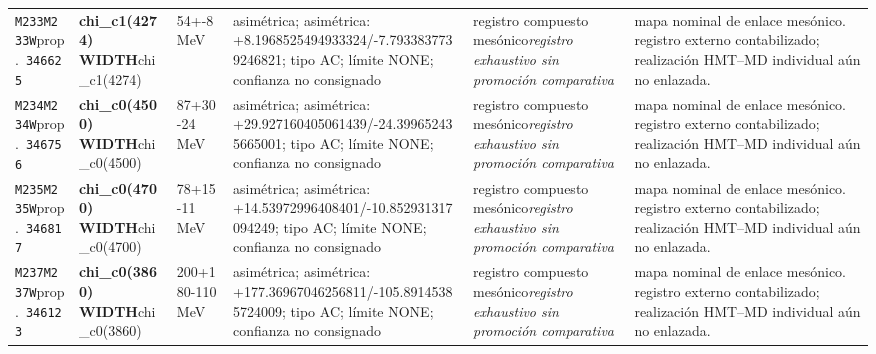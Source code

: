 \begin{landscape}
\begin{longtable}{L{1.85cm}L{4.45cm}L{2.35cm}L{4.05cm}L{3.35cm}L{7.15cm}}
\texttt{M233}\newline \texttt{M233W}\newline prop.\ \texttt{346625} & \textbf{chi\_\allowbreak{}c1(4274) WIDTH}\newline chi\_\allowbreak{}c1(4274) & 54+-8\,MeV & asimétrica; asimétrica: +8.1968525494933324/-7.7933837739246821; tipo AC; límite NONE; confianza no consignado & registro compuesto mesónico\newline \emph{registro exhaustivo sin promoción comparativa} & mapa nominal de enlace mesónico. registro externo contabilizado; realización HMT--MD individual aún no enlazada. \\
\texttt{M234}\newline \texttt{M234W}\newline prop.\ \texttt{346756} & \textbf{chi\_\allowbreak{}c0(4500) WIDTH}\newline chi\_\allowbreak{}c0(4500) & 87+30-24\,MeV & asimétrica; asimétrica: +29.927160405061439/-24.399652435665001; tipo AC; límite NONE; confianza no consignado & registro compuesto mesónico\newline \emph{registro exhaustivo sin promoción comparativa} & mapa nominal de enlace mesónico. registro externo contabilizado; realización HMT--MD individual aún no enlazada. \\
\texttt{M235}\newline \texttt{M235W}\newline prop.\ \texttt{346817} & \textbf{chi\_\allowbreak{}c0(4700) WIDTH}\newline chi\_\allowbreak{}c0(4700) & 78+15-11\,MeV & asimétrica; asimétrica: +14.53972996408401/-10.852931317094249; tipo AC; límite NONE; confianza no consignado & registro compuesto mesónico\newline \emph{registro exhaustivo sin promoción comparativa} & mapa nominal de enlace mesónico. registro externo contabilizado; realización HMT--MD individual aún no enlazada. \\
\texttt{M237}\newline \texttt{M237W}\newline prop.\ \texttt{346123} & \textbf{chi\_\allowbreak{}c0(3860) WIDTH}\newline chi\_\allowbreak{}c0(3860) & 200+180-110\,MeV & asimétrica; asimétrica: +177.36967046256811/-105.89145385724009; tipo AC; límite NONE; confianza no consignado & registro compuesto mesónico\newline \emph{registro exhaustivo sin promoción comparativa} & mapa nominal de enlace mesónico. registro externo contabilizado; realización HMT--MD individual aún no enlazada. \\

\end{longtable}
\end{landscape}
